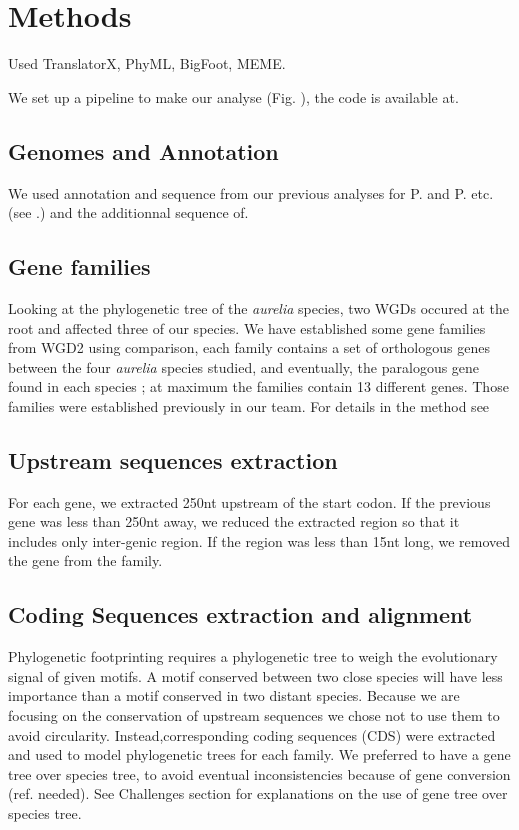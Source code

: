 \section*{Methods}

Used TranslatorX, PhyML, BigFoot, MEME.

We set up a pipeline to make our analyse (Fig. ), the code is available at.

\subsection*{Genomes and Annotation}

We used annotation and sequence from our previous analyses for P. and P. etc. (see .) and the additionnal sequence of.

\subsection*{Gene families}

Looking at the phylogenetic tree of the \textit{aurelia} species, two WGDs occured at the root and affected three of our species. We have established some gene families from WGD2 using comparison, each family contains a set of orthologous genes between the four \textit{aurelia} species studied, and eventually, the paralogous gene found in each species ; at maximum the families contain 13 different genes. Those families were established previously in our team. For details in the method see

\subsection*{Upstream sequences extraction}

For each gene, we extracted 250nt upstream of the start codon. If the previous gene was less than 250nt away, we reduced the extracted region so that it includes only inter-genic region. If the region was less than 15nt long, we removed the gene from the family.

\subsection*{Coding Sequences extraction and alignment}

Phylogenetic footprinting requires a phylogenetic tree to weigh the evolutionary signal of given motifs. A motif conserved between two close species will have less importance than a motif conserved in two distant species. Because we are focusing on the conservation of upstream sequences we chose not to use them to avoid circularity. Instead,corresponding coding sequences (CDS) were extracted and used to model phylogenetic trees for each family. We preferred to have a gene tree over species tree, to avoid eventual inconsistencies because of gene conversion (ref. needed). See Challenges section for explanations on the use of gene tree over species tree.

